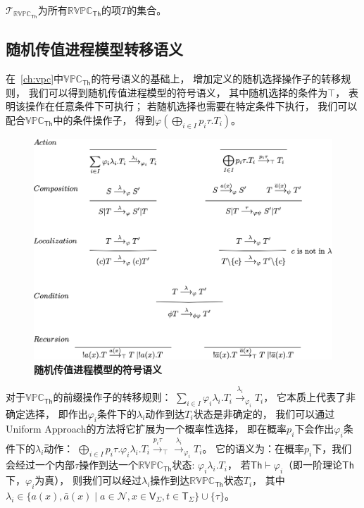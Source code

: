 $\mathcal{T}_{\mathbb{RVPC}_{\mathsf{Th}}}$为所有$\mathbb{RVPC}_\mathsf{Th}$的项$T$的集合。

\subsection{随机传值进程模型转移语义}
在~\ref{ch:vpc}中$\mathbb{VPC}_{\mathsf{Th}}$的符号语义的基础上，
增加\label{fig_rccs}定义的随机选择操作子的转移规则，
我们可以得到随机传值进程模型的符号语义，
其中随机选择的条件为$\top$，
表明该操作在任意条件下可执行；
若随机选择也需要在特定条件下执行，
我们可以配合$\mathbb{VPC}_{\mathsf{Th}}$中的条件操作子，
得到$\varphi (\bigoplus_{i\in I}p_i\tau.T_i)$。

\begin{figure}[!htbp]
	\small
	\centering
	\includegraphics[width=14cm]{../figure/symbolic_sematic.png}
    \caption{\textbf{随机传值进程模型的符号语义}}
    \label{fig_sematic}
\end{figure}

对于$\mathbb{VPC}_{\mathsf{Th}}$的前缀操作子的转移规则：
$\sum_{i\in I} \varphi_i \lambda_i. T_i\stackrel{\lambda_i}{\rightarrow}_{\varphi_i} T_i$，
它本质上代表了非确定选择，
即作出$\varphi_i$条件下的$\lambda_i$动作到达$T_i$状态是非确定的，
我们可以通过Uniform Approach的方法将它扩展为一个概率性选择，
即在概率$p_i$下会作出$\varphi_i$条件下的$\lambda_i$动作：
$\bigoplus_{i\in I} p_i\tau.\varphi_i \lambda_i. T_i\stackrel{p_i\tau}{\rightarrow}_{\top}\stackrel{\lambda_i}{\rightarrow}_{\varphi_i} T_i$。
它的语义为：在概率$p_i$下，我们会经过一个内部$\tau$操作到达一个$\mathbb{RVPC}_{\mathsf{Th}}$状态:
$\varphi_i\lambda_i.T_i$，
若$\mathsf{Th}\vdash \varphi_i$（即一阶理论$\mathsf{Th}$下，$\varphi_i$为真），
则我们可以经过$\lambda_i$操作到达$\mathbb{RVPC}_{\mathsf{Th}}$状态$T_i$， 
其中$\lambda_i \in \{a(x),\bar{a}(x)\mid a\in \mathcal{N}, x\in \mathsf{V}_\Sigma, t\in \mathsf{T}_\Sigma\}\cup \{\tau\}$。

